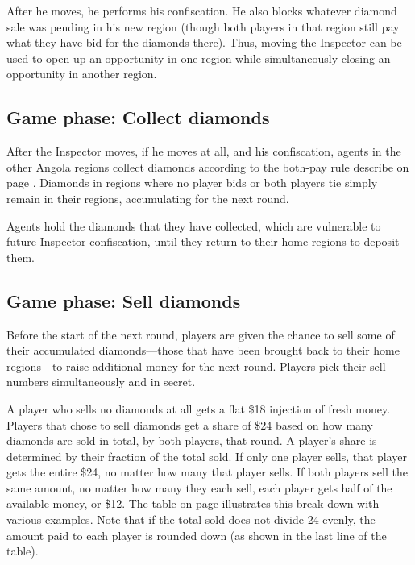 \documentclass[8pt]{extbook}
\begin{document}
After he moves, he performs his confiscation.  He also blocks whatever diamond sale was pending in his new region (though both players in that region still pay what they have bid for the diamonds there).  Thus, moving the Inspector can be used to open up an opportunity in one region while simultaneously closing an opportunity in another region.

\subsection{Game phase:  Collect diamonds}
\label{sec:collectPhase}

After the Inspector moves, if he moves at all, and his confiscation, agents in the other Angola regions collect diamonds according to the both-pay rule describe on page \pageref{sec:aboutBids}.  Diamonds in regions where no player bids or both players tie simply remain in their regions, accumulating for the next round.

Agents hold the diamonds that they have collected, which are vulnerable to future Inspector confiscation, until they return to their home regions to deposit them.


\subsection{Game phase:  Sell diamonds}
\label{sec:sellPhase}

Before the start of the next round, players are given the chance to sell some of their accumulated diamonds---those that have been brought back to their home regions---to raise additional money for the next round.  Players pick their sell numbers simultaneously and in secret.

A player who sells no diamonds at all gets a flat \$18 injection of fresh money.  Players that chose to sell diamonds get a share of \$24 based on how many diamonds are sold in total, by both players, that round.  A player's share is determined by their fraction of the total sold.  If only one player sells, that player gets the entire \$24, no matter how many that player sells.  If both players sell the same amount, no matter how many they each sell, each player gets half of the available money, or \$12.  The table on page \pageref{fig:sellTable} illustrates this break-down with various examples.  Note that if the total sold does not divide 24 evenly, the amount paid to each player is rounded down (as shown in the last line of the table).
\end{document}
